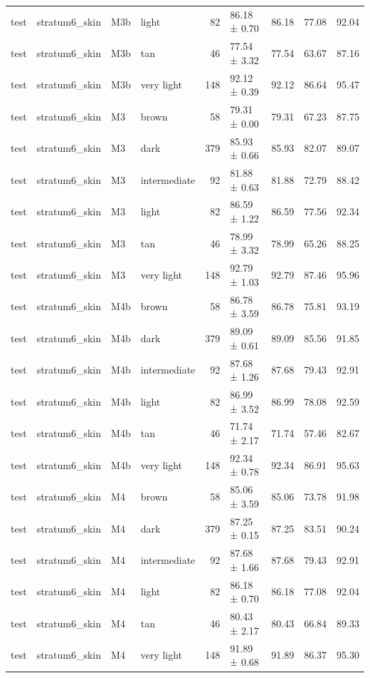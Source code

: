\begin{tabular}{llllrlrrr}
test & stratum6\_skin & M3b & light & 82 & 86.18 ± 0.70 & 86.18 & 77.08 & 92.04 \\
test & stratum6\_skin & M3b & tan & 46 & 77.54 ± 3.32 & 77.54 & 63.67 & 87.16 \\
test & stratum6\_skin & M3b & very light & 148 & 92.12 ± 0.39 & 92.12 & 86.64 & 95.47 \\
test & stratum6\_skin & M3 & brown & 58 & 79.31 ± 0.00 & 79.31 & 67.23 & 87.75 \\
test & stratum6\_skin & M3 & dark & 379 & 85.93 ± 0.66 & 85.93 & 82.07 & 89.07 \\
test & stratum6\_skin & M3 & intermediate & 92 & 81.88 ± 0.63 & 81.88 & 72.79 & 88.42 \\
test & stratum6\_skin & M3 & light & 82 & 86.59 ± 1.22 & 86.59 & 77.56 & 92.34 \\
test & stratum6\_skin & M3 & tan & 46 & 78.99 ± 3.32 & 78.99 & 65.26 & 88.25 \\
test & stratum6\_skin & M3 & very light & 148 & 92.79 ± 1.03 & 92.79 & 87.46 & 95.96 \\
test & stratum6\_skin & M4b & brown & 58 & 86.78 ± 3.59 & 86.78 & 75.81 & 93.19 \\
test & stratum6\_skin & M4b & dark & 379 & 89.09 ± 0.61 & 89.09 & 85.56 & 91.85 \\
test & stratum6\_skin & M4b & intermediate & 92 & 87.68 ± 1.26 & 87.68 & 79.43 & 92.91 \\
test & stratum6\_skin & M4b & light & 82 & 86.99 ± 3.52 & 86.99 & 78.08 & 92.59 \\
test & stratum6\_skin & M4b & tan & 46 & 71.74 ± 2.17 & 71.74 & 57.46 & 82.67 \\
test & stratum6\_skin & M4b & very light & 148 & 92.34 ± 0.78 & 92.34 & 86.91 & 95.63 \\
test & stratum6\_skin & M4 & brown & 58 & 85.06 ± 3.59 & 85.06 & 73.78 & 91.98 \\
test & stratum6\_skin & M4 & dark & 379 & 87.25 ± 0.15 & 87.25 & 83.51 & 90.24 \\
test & stratum6\_skin & M4 & intermediate & 92 & 87.68 ± 1.66 & 87.68 & 79.43 & 92.91 \\
test & stratum6\_skin & M4 & light & 82 & 86.18 ± 0.70 & 86.18 & 77.08 & 92.04 \\
test & stratum6\_skin & M4 & tan & 46 & 80.43 ± 2.17 & 80.43 & 66.84 & 89.33 \\
test & stratum6\_skin & M4 & very light & 148 & 91.89 ± 0.68 & 91.89 & 86.37 & 95.30 \\

\end{tabular}
